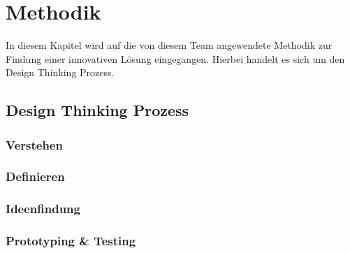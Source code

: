 \newpage

\section{Methodik} \label{methodik}
In diesem Kapitel wird auf die von diesem Team angewendete Methodik zur Findung einer innovativen Lösung eingegangen. Hierbei handelt es sich um den Design Thinking Prozess.

\subsection{Design Thinking Prozess} \label{designThinking}

\subsubsection{Verstehen} \label{verstehen}

\subsubsection{Definieren} \label{definieren}

\subsubsection{Ideenfindung} \label{ideenfindung}

\subsubsection{Prototyping \& Testing} \label{prototypingTesting}
